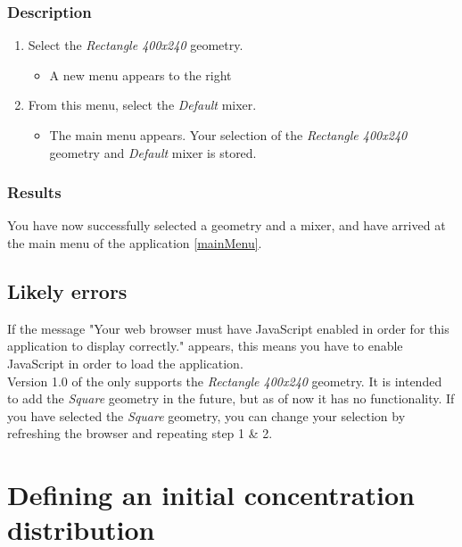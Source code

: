 \subsubsection{Description}

\begin{enumerate}
\item Select the \emph{Rectangle 400x240} geometry.
\begin{itemize}
  \item A new menu appears to the right
\end{itemize}
\item From this menu, select the \emph{Default} mixer.
\begin{itemize}
  \item The main menu appears. Your selection of the \emph{Rectangle 400x240} geometry and \emph{Default} mixer is stored.
\end{itemize}
\end{enumerate}

\subsubsection{Results}
You have now successfully selected a geometry and a mixer, and have arrived at the main menu of the application \ref{mainMenu}.


\subsection{Likely errors}
If the message "Your web browser must have JavaScript enabled in order for this application to display correctly." appears, this means you have to enable JavaScript in order to load the application.\\

\noindent Version 1.0 of the \applicationname{} only supports the \emph{Rectangle 400x240} geometry. It is intended to add the \emph{Square} geometry in the future, but as of now it has no functionality. If you have selected the \emph{Square} geometry, you can change your selection by refreshing the browser and repeating step 1 \& 2.\\


\section{Defining an initial concentration distribution}
\label{sec:defineDist}

